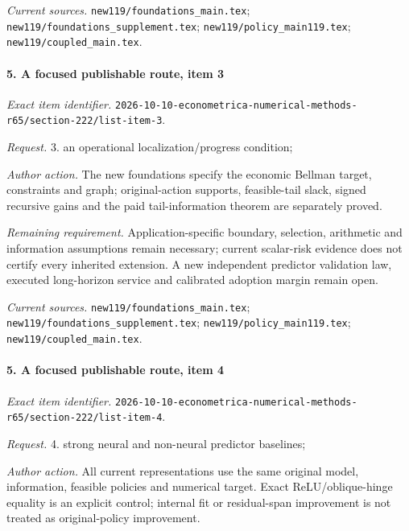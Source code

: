 \par\emph{Current sources.} \nolinkurl{new119/foundations_main.tex}; \nolinkurl{new119/foundations_supplement.tex}; \nolinkurl{new119/policy_main119.tex}; \nolinkurl{new119/coupled_main.tex}.

\paragraph{5. A focused publishable route, item 3}

\emph{Exact item identifier.} \nolinkurl{2026-10-10-econometrica-numerical-methods-r65/section-222/list-item-3}.

\par\emph{Request.} 3. an operational localization/\allowbreak{}progress condition;

\par\emph{Author action.} The new foundations specify the economic Bellman target, constraints and graph; original-action supports, feasible-tail slack, signed recursive gains and the paid tail-information theorem are separately proved.

\par\emph{Remaining requirement.} Application-specific boundary, selection, arithmetic and information assumptions remain necessary; current scalar-risk evidence does not certify every inherited extension. A new independent predictor validation law, executed long-horizon service and calibrated adoption margin remain open.

\par\emph{Current sources.} \nolinkurl{new119/foundations_main.tex}; \nolinkurl{new119/foundations_supplement.tex}; \nolinkurl{new119/policy_main119.tex}; \nolinkurl{new119/coupled_main.tex}.

\paragraph{5. A focused publishable route, item 4}

\emph{Exact item identifier.} \nolinkurl{2026-10-10-econometrica-numerical-methods-r65/section-222/list-item-4}.

\par\emph{Request.} 4. strong neural and non-neural predictor baselines;

\par\emph{Author action.} All current representations use the same original model, information, feasible policies and numerical target. Exact ReLU/\allowbreak{}oblique-hinge equality is an explicit control; internal fit or residual-span improvement is not treated as original-policy improvement.

